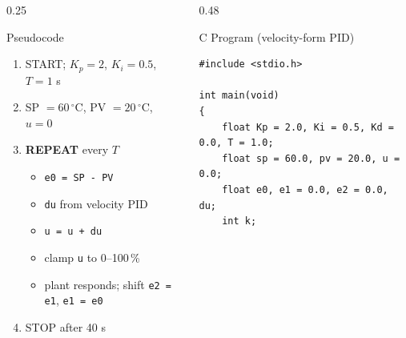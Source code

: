 \documentclass[aspectratio=169]{beamer}
\begin{document}
	\begin{frame}{}

		\vspace*{0.05cm}

		\begin{columns}[T,onlytextwidth]


			\begin{column}{0.25\textwidth}

				\begin{block}{Pseudocode}
					\scriptsize
					\begin{enumerate}
						\item START; $K_p = 2$, $K_i = 0.5$, $T = 1$ s
						\item SP $= 60\,^\circ$C, PV $= 20\,^\circ$C, $u = 0$
						\item \textbf{REPEAT} every $T$
						\begin{itemize}\scriptsize
							\item \texttt{e0 = SP - PV}
							\item \texttt{du} from velocity PID
							\item \texttt{u = u + du}
							\item clamp \texttt{u} to 0--100\,\%
							\item plant responds; shift \texttt{e2 = e1}, \texttt{e1 = e0}
						\end{itemize}
						\item STOP after 40 s
					\end{enumerate}
				\end{block}

			\end{column}


			\hspace*{0.3cm}
			\begin{column}{0.48\textwidth}

				\begin{block}{C Program (velocity-form PID)}

\begin{lstlisting}[style=cstyle,numbers=none,basicstyle=\ttfamily\scriptsize]
#include <stdio.h>

int main(void)
{
	float Kp = 2.0, Ki = 0.5, Kd = 0.0, T = 1.0;
	float sp = 60.0, pv = 20.0, u = 0.0;
	float e0, e1 = 0.0, e2 = 0.0, du;
	int k;


\end{lstlisting}
\end{block}
\end{column}
\end{columns}
\end{frame}
\end{document}
